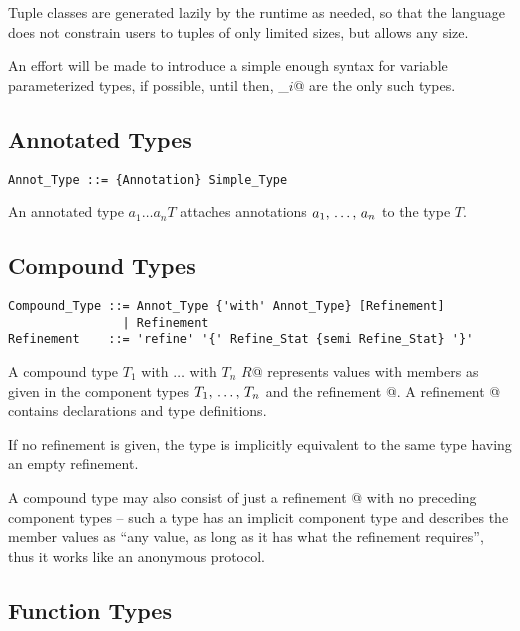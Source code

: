 Tuple classes are generated lazily by the runtime as needed, so that the language does not constrain users to tuples of only limited sizes, but allows any size. 

An effort will be made to introduce a simple enough syntax for variable parameterized types, if possible, until then, \lstinline@Tuple_$i$@ are the only such types. 

\subsection{Annotated Types}

\syntax\begin{lstlisting}
Annot_Type ::= {Annotation} Simple_Type
\end{lstlisting}

An annotated type $a_1 \ldots a_n T$ attaches annotations $a_1 ,\, \ldots ,\, a_n$ to the type $T$. %

\subsection{Compound Types}
\label{sec:compound-types}

\syntax\begin{lstlisting}
Compound_Type ::= Annot_Type {'with' Annot_Type} [Refinement]
                | Refinement
Refinement    ::= 'refine' '{' Refine_Stat {semi Refine_Stat} '}'
\end{lstlisting} %

A compound type \lstinline@$T_1$ with $\ldots$ with $T_n$ {$R$}@ represents values with members as given in the component types $T_1 ,\, \ldots ,\, T_n$ and the refinement @. A refinement @ contains declarations and type definitions. 

If no refinement is given, the type is implicitly equivalent to the same type having an empty refinement. 

A compound type may also consist of just a refinement @ with no preceding component types -- such a type has an implicit component type  and describes the member values as ``any value, as long as it has what the refinement requires'', thus it works like an anonymous protocol. 

\subsection{Function Types}
\label{sec:function-types}

